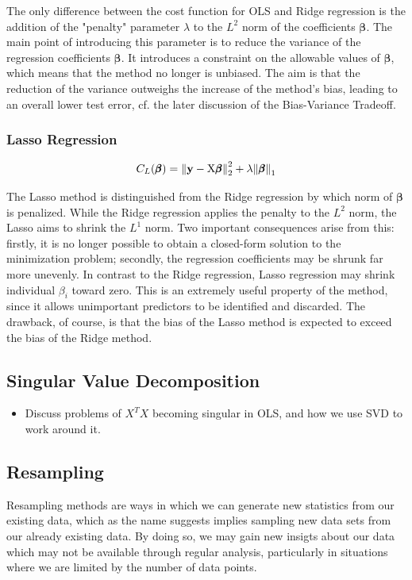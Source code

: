 \documentclass[reprint, english, nofootinbib]{revtex4-2}
\begin{document}
			The only difference between the cost function for OLS and Ridge regression is the addition of the "penalty" parameter $\lambda$ to the $L^2$ norm of the coefficients $\pmb{\beta}$. The main point of introducing this parameter is to reduce the variance of the regression coefficients $\pmb{\beta}$. It introduces a constraint on the allowable values of $\pmb{\beta}$, which means that the method no longer is unbiased. The aim is that the reduction of the variance outweighs the increase of the method's bias, leading to an overall lower test error, cf. the later discussion of the Bias-Variance Tradeoff.
            
        \subsubsection{Lasso Regression}
            \begin{equation}
                C_L(\pmb \beta) =
                \norm{\mathbf y - \textup{X}\pmb{\beta}}_2^2
                + \lambda\norm{\pmb{\beta}}_1
            \end{equation}
            
	The Lasso method is distinguished from the Ridge regression by which norm of $\pmb{\beta}$ is penalized. While the Ridge regression applies the penalty to the $L^2$ norm, the Lasso aims to shrink the $L^1$ norm. Two important consequences arise from this: firstly, it is no longer possible to obtain a closed-form solution to the minimization problem; secondly, the regression coefficients may be shrunk far more unevenly. In contrast to the Ridge regression, Lasso regression may shrink individual $\beta_{i}$ toward zero. This is an extremely useful property of the method, since it allows unimportant predictors to be identified and discarded. The drawback, of course, is that the bias of the Lasso method is expected to exceed the bias of the Ridge method.
	
    \subsection{Singular Value Decomposition}
        \begin{itemize}
            \item Discuss problems of $X^T X$ becoming singular in OLS, and how we use SVD to work around it.
        \end{itemize}



    \subsection{Resampling}
        \noindent
        Resampling methods are ways in which we can generate new statistics from our existing data, which as the name suggests implies sampling new data sets from our already existing data. By doing so, we may gain new insigts about our data which may not be available through regular analysis, particularly in situations where we are limited by the number of data points.
\end{document}

